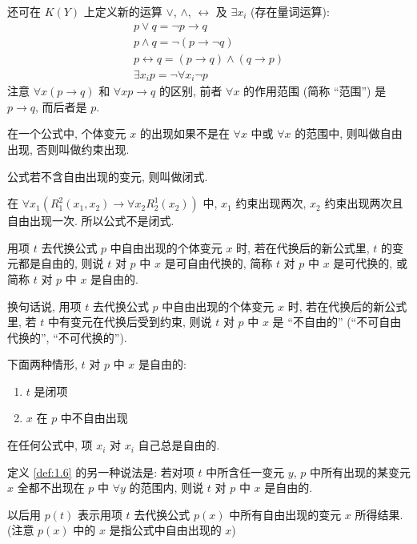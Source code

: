 \documentclass[
    color=black,
    device=normal,
    lang=cn
]{elegantnote}
\begin{document}
还可在 $K(Y)$ 上定义新的运算 $\lor$, $\land$, $\leftrightarrow$ 及 $\exists x_i$ (存在量词运算):
\begin{gather*}
    p\lor q = \lnot p \to q\\
    p\land q = \lnot (p\to \lnot q)\\
    p\leftrightarrow q = (p\to q)\land (q\to p)\\
    \exists x_i p=\lnot \forall x_i \lnot p
\end{gather*}
注意 $\forall x(p\to q)$ 和 $\forall xp\to q$ 的区别, 前者 $\forall x$ 的作用范围 (简称 ``范围'') 是 $p\to q$, 而后者是 $p$.
\begin{definition}[变元的自由出现与约束出现]
    在一个公式中, 个体变元 $x$ 的出现如果不是在 $\forall x$ 中或 $\forall x$ 的范围中, 则叫做自由出现, 否则叫做约束出现.
\end{definition}
\begin{definition}
    公式若不含自由出现的变元, 则叫做闭式.
\end{definition}
\begin{example}
    在 $\forall x_1 (R_1^2(x_1, x_2)\to \forall x_2 R_2^1(x_2))$ 中, $x_1$ 约束出现两次, $x_2$ 约束出现两次且自由出现一次. 所以公式不是闭式.
\end{example}
\begin{definition}\label{def:1.6}
    用项 $t$ 去代换公式 $p$ 中自由出现的个体变元 $x$ 时, 若在代换后的新公式里, $t$ 的变元都是自由的, 则说 $t$ 对 $p$ 中 $x$ 是可自由代换的, 简称 $t$ 对 $p$ 中 $x$ 是可代换的, 或简称 $t$ 对 $p$ 中 $x$ 是自由的.

    换句话说, 用项 $t$ 去代换公式 $p$ 中自由出现的个体变元 $x$ 时, 若在代换后的新公式里, 若 $t$ 中有变元在代换后受到约束, 则说 $t$ 对 $p$ 中 $x$ 是 ``不自由的'' (``不可自由代换的'', ``不可代换的'').
\end{definition}
下面两种情形, $t$ 对 $p$ 中 $x$ 是自由的:
\begin{enumerate}[label = $\arabic*^\circ$]
    \item $t$ 是闭项
    \item $x$ 在 $p$ 中不自由出现
\end{enumerate}
在任何公式中, 项 $x_i$ 对 $x_i$ 自己总是自由的.

定义 \ref{def:1.6} 的另一种说法是: 若对项 $t$ 中所含任一变元 $y$, $p$ 中所有出现的某变元 $x$ 全都不出现在 $p$ 中 $\forall y$ 的范围内, 则说 $t$ 对 $p$ 中 $x$ 是自由的.

以后用 $p(t)$ 表示用项 $t$ 去代换公式 $p(x)$ 中所有自由出现的变元 $x$ 所得结果. (注意 $p(x)$ 中的 $x$ 是指公式中自由出现的 $x$)
\end{document}
